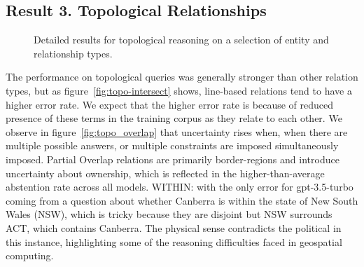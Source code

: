 \subsection{Result 3. Topological Relationships}

\begin{figure}[h]
    \centering
    \hfill
    \hfill
    \caption{Detailed results for topological reasoning on a selection of entity and relationship types.}
    \label{fig:topo_plots}
\end{figure}

The performance on topological queries was generally stronger than other relation types, but as figure~\ref{fig:topo-intersect} shows, line-based relations tend to have a higher error rate. 
We expect that the higher error rate is because of reduced presence of these terms in the training corpus as they relate to each other. 
We observe in figure~\ref{fig:topo_overlap} that uncertainty rises when, when there are multiple possible answers, or multiple constraints are imposed simultaneously imposed. Partial Overlap relations are primarily border-regions and introduce uncertainty about ownership, which is reflected in the higher-than-average abstention rate across all models.
WITHIN: with the only error for gpt-3.5-turbo coming from a question about whether Canberra is within the state of New South Wales (NSW), which is tricky because they are disjoint but NSW surrounds ACT, which contains Canberra. The physical sense contradicts the political in this instance, highlighting some of the reasoning difficulties faced in geospatial computing.

